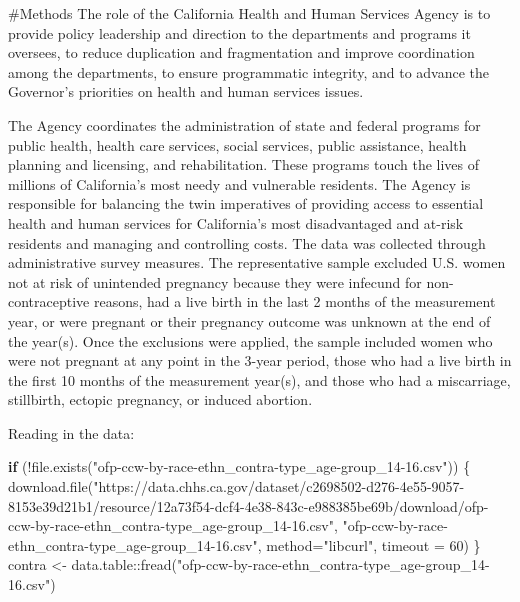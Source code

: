 \documentclass[
]{article}
\newenvironment{Shaded}{\begin{snugshade}}{\end{snugshade}}
\newcommand{\AttributeTok}[1]{\textcolor[rgb]{0.77,0.63,0.00}{#1}}
\newcommand{\ControlFlowTok}[1]{\textcolor[rgb]{0.13,0.29,0.53}{\textbf{#1}}}
\newcommand{\DecValTok}[1]{\textcolor[rgb]{0.00,0.00,0.81}{#1}}
\newcommand{\FunctionTok}[1]{\textcolor[rgb]{0.00,0.00,0.00}{#1}}
\newcommand{\NormalTok}[1]{#1}
\newcommand{\OtherTok}[1]{\textcolor[rgb]{0.56,0.35,0.01}{#1}}
\newcommand{\SpecialCharTok}[1]{\textcolor[rgb]{0.00,0.00,0.00}{#1}}
\newcommand{\StringTok}[1]{\textcolor[rgb]{0.31,0.60,0.02}{#1}}
\begin{document}
\#Methods The role of the California Health and Human Services Agency is
to provide policy leadership and direction to the departments and
programs it oversees, to reduce duplication and fragmentation and
improve coordination among the departments, to ensure programmatic
integrity, and to advance the Governor's priorities on health and human
services issues.

The Agency coordinates the administration of state and federal programs
for public health, health care services, social services, public
assistance, health planning and licensing, and rehabilitation. These
programs touch the lives of millions of California's most needy and
vulnerable residents. The Agency is responsible for balancing the twin
imperatives of providing access to essential health and human services
for California's most disadvantaged and at-risk residents and managing
and controlling costs. The data was collected through administrative
survey measures. The representative sample excluded U.S. women not at
risk of unintended pregnancy because they were infecund for
non-contraceptive reasons, had a live birth in the last 2 months of the
measurement year, or were pregnant or their pregnancy outcome was
unknown at the end of the year(s). Once the exclusions were applied, the
sample included women who were not pregnant at any point in the 3-year
period, those who had a live birth in the first 10 months of the
measurement year(s), and those who had a miscarriage, stillbirth,
ectopic pregnancy, or induced abortion.

Reading in the data:

\begin{Shaded}
\begin{Highlighting}[]
\ControlFlowTok{if}\NormalTok{ (}\SpecialCharTok{!}\FunctionTok{file.exists}\NormalTok{(}\StringTok{"ofp{-}ccw{-}by{-}race{-}ethn\_contra{-}type\_age{-}group\_14{-}16.csv"}\NormalTok{)) \{}
\FunctionTok{download.file}\NormalTok{(}\StringTok{"https://data.chhs.ca.gov/dataset/c2698502{-}d276{-}4e55{-}9057{-}8153e39d21b1/resource/12a73f54{-}dcf4{-}4e38{-}843c{-}e988385be69b/download/ofp{-}ccw{-}by{-}race{-}ethn\_contra{-}type\_age{-}group\_14{-}16.csv"}\NormalTok{, }\StringTok{"ofp{-}ccw{-}by{-}race{-}ethn\_contra{-}type\_age{-}group\_14{-}16.csv"}\NormalTok{, }\AttributeTok{method=}\StringTok{"libcurl"}\NormalTok{, }\AttributeTok{timeout =} \DecValTok{60}\NormalTok{) }
\NormalTok{\}}
\NormalTok{contra }\OtherTok{\textless{}{-}}\NormalTok{ data.table}\SpecialCharTok{::}\FunctionTok{fread}\NormalTok{(}\StringTok{"ofp{-}ccw{-}by{-}race{-}ethn\_contra{-}type\_age{-}group\_14{-}16.csv"}\NormalTok{) }
\end{Highlighting}
\end{Shaded}
\end{document}
